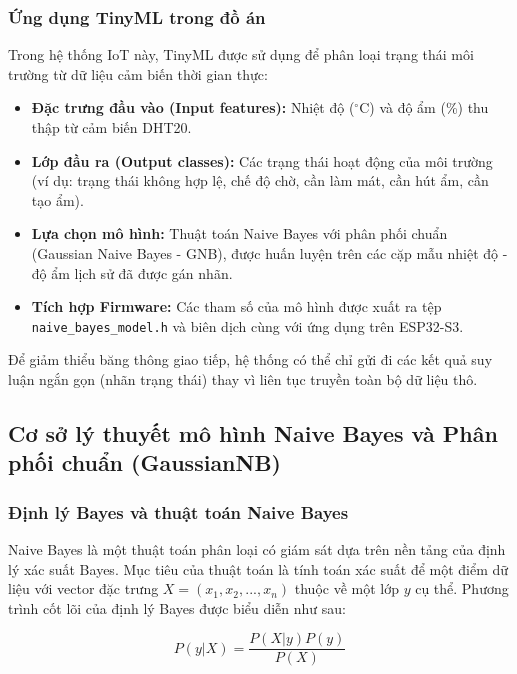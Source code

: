 \subsubsection{Ứng dụng TinyML trong đồ án}
Trong hệ thống IoT này, TinyML được sử dụng để phân loại trạng thái môi trường từ dữ liệu cảm biến thời gian thực:
\begin{itemize}
    \item \textbf{Đặc trưng đầu vào (Input features):} Nhiệt độ ($^\circ$C) và độ ẩm (\%) thu thập từ cảm biến DHT20.
    \item \textbf{Lớp đầu ra (Output classes):} Các trạng thái hoạt động của môi trường (ví dụ: trạng thái không hợp lệ, chế độ chờ, cần làm mát, cần hút ẩm, cần tạo ẩm).
    \item \textbf{Lựa chọn mô hình:} Thuật toán Naive Bayes với phân phối chuẩn (Gaussian Naive Bayes - GNB), được huấn luyện trên các cặp mẫu nhiệt độ - độ ẩm lịch sử đã được gán nhãn.
    \item \textbf{Tích hợp Firmware:} Các tham số của mô hình được xuất ra tệp \texttt{naive\_bayes\_model.h} và biên dịch cùng với ứng dụng trên ESP32-S3.
\end{itemize}

Để giảm thiểu băng thông giao tiếp, hệ thống có thể chỉ gửi đi các kết quả suy luận ngắn gọn (nhãn trạng thái) thay vì liên tục truyền toàn bộ dữ liệu thô.

\subsection{Cơ sở lý thuyết mô hình Naive Bayes và Phân phối chuẩn (GaussianNB)}

\subsubsection{Định lý Bayes và thuật toán Naive Bayes}
Naive Bayes là một thuật toán phân loại có giám sát dựa trên nền tảng của định lý xác suất Bayes. Mục tiêu của thuật toán là tính toán xác suất để một điểm dữ liệu với vector đặc trưng $X = (x_1, x_2, ..., x_n)$ thuộc về một lớp $y$ cụ thể. Phương trình cốt lõi của định lý Bayes được biểu diễn như sau:

\begin{equation}
P(y|X) = \frac{P(X|y)P(y)}{P(X)}
\end{equation}

